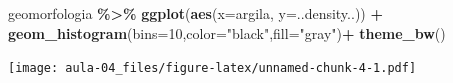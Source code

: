 \documentclass[
]{article}
\newenvironment{Shaded}{\begin{snugshade}}{\end{snugshade}}
\newcommand{\AttributeTok}[1]{\textcolor[rgb]{0.13,0.29,0.53}{#1}}
\newcommand{\DecValTok}[1]{\textcolor[rgb]{0.00,0.00,0.81}{#1}}
\newcommand{\FunctionTok}[1]{\textcolor[rgb]{0.13,0.29,0.53}{\textbf{#1}}}
\newcommand{\NormalTok}[1]{#1}
\newcommand{\SpecialCharTok}[1]{\textcolor[rgb]{0.81,0.36,0.00}{\textbf{#1}}}
\newcommand{\StringTok}[1]{\textcolor[rgb]{0.31,0.60,0.02}{#1}}
\begin{document}
\begin{Shaded}
\begin{Highlighting}[]
\NormalTok{geomorfologia }\SpecialCharTok{\%\textgreater{}\%} 
  \FunctionTok{ggplot}\NormalTok{(}\FunctionTok{aes}\NormalTok{(}\AttributeTok{x=}\NormalTok{argila, }\AttributeTok{y=}\NormalTok{..density..)) }\SpecialCharTok{+}
  \FunctionTok{geom\_histogram}\NormalTok{(}\AttributeTok{bins=}\DecValTok{10}\NormalTok{,}\AttributeTok{color=}\StringTok{"black"}\NormalTok{,}\AttributeTok{fill=}\StringTok{"gray"}\NormalTok{)}\SpecialCharTok{+}
  \FunctionTok{theme\_bw}\NormalTok{()}
\end{Highlighting}
\end{Shaded}

\texttt{[image: aula-04\_files/figure-latex/unnamed-chunk-4-1.pdf]}
\end{document}
